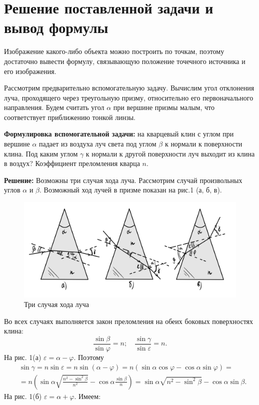 \documentclass[a4paper,12pt]{article} %
\begin{document}
\section{Решение поставленной задачи и вывод формулы}
Изображение какого-либо объекта можно построить по точкам, поэтому достаточно вывести формулу, связывающую положение точечного источника и его изображения.

Рассмотрим предварительно вспомогательную задачу. Вычислим угол отклонения луча, проходящего через треугольную призму, относительно его первоначального направления. Будем считать угол $\alpha$ при вершине призмы малым, что соответствует приближению тонкой линзы.

\textbf{Формулировка вспомогательной задачи:} на кварцевый клин с углом при вершине $\alpha$ падает из воздуха луч света под углом $\beta$ к нормали к поверхности клина. Под каким углом $\gamma$ к нормали к другой поверхности луч выходит из клина в воздух? Коэффициент преломления кварца $n$.

\textbf{Решение:} Возможны три случая хода луча. Рассмотрим случай произвольных углов $\alpha$ и $\beta$. Возможный ход лучей в призме показан на рис.1 (а, б, в).

\begin{figure}[h!]
	\centering
	\includegraphics[scale=0.22]{IMG_1466.JPG}
	\caption{Три случая хода луча}
\end{figure}

Во всех случаях выполняется закон преломления на обеих боковых поверхностях клина:
$$
\frac{\sin \beta}{\sin \varphi}=n ; \quad \frac{\sin \gamma}{\sin \varepsilon}=n .
$$
На рис. 1(а) $\varepsilon=\alpha-\varphi$. Поэтому
$$
\begin{aligned}
&\sin \gamma=n \sin \varepsilon=n \sin (\alpha-\varphi)=n(\sin \alpha \cos \varphi-\cos \alpha \sin \varphi)= \\
&=n\left(\sin \alpha \sqrt{\frac{n^{2}- \sin ^{2} \beta}{n^{2}}}-\cos \alpha \frac{\sin \beta}{n}\right)=\sin \alpha \sqrt{n^{2}-\sin ^{2} \beta}-\cos \alpha \sin \beta .
\end{aligned}
$$
На рис. 1(б) $ \varepsilon=\alpha+\varphi$. Имеем:
\end{document}
